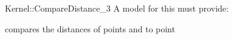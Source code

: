 \begin{ccRefFunctionObjectConcept}{Kernel::CompareDistance_3}
A model for this must provide:


      {compares the distances of points  and  to point }

\ccSeeAlso
{} \\

\end{ccRefFunctionObjectConcept}

